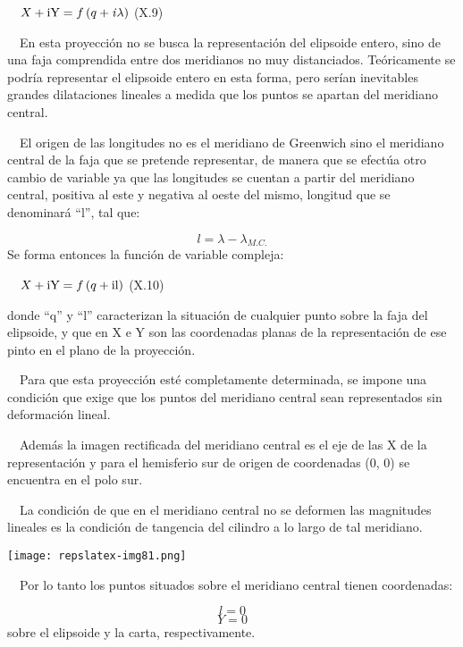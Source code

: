 \documentclass{tufte-book}
\newcommand\normalsubformula[1]{\text{\mathversion{normal}$#1$}}
\begin{document}
\ \  ${X+\normalsubformula{\text{iY}}=f\left(q+\mathit{i\lambda
}\right)}$  (X.9)

\ \ En esta proyección no se busca la representación del elipsoide
entero, sino de una faja comprendida entre dos meridianos no muy
distanciados. Teóricamente se podría representar el elipsoide
entero en esta forma, pero serían inevitables grandes dilataciones
lineales a medida que los puntos se apartan del meridiano central.

\ \ El origen de las longitudes no es el meridiano de Greenwich sino el
meridiano central de la faja que se pretende representar, de manera que
se efectúa otro cambio de variable ya que las longitudes se cuentan a
partir del meridiano central, positiva al este y negativa al oeste del
mismo, longitud que se denominará
{\textquotedblleft}l{\textquotedblright}, tal que:

\begin{equation*}
{l=\lambda -\lambda _{{M\text{.}C\text{.}}}}
\end{equation*}
Se forma entonces la función de variable compleja:

\ \ 
${X+\normalsubformula{\text{iY}}=f\left(q+\normalsubformula{\text{il}}\right)}$
 (X.10)

donde {\textquotedblleft}q{\textquotedblright} y
{\textquotedblleft}l{\textquotedblright} caracterizan la situación de
cualquier punto sobre la faja del elipsoide, y que en X e Y son las
coordenadas planas de la representación de ese pinto en el plano de
la proyección.

\ \ Para que esta proyección esté completamente determinada, se
impone una condición que exige que los puntos del meridiano central
sean representados sin deformación lineal.

\ \ Además la imagen rectificada del meridiano central es el eje de
las X de la representación y para el hemisferio sur de origen de
coordenadas (0, 0) se encuentra en el polo sur.

\ \ La condición de que en el meridiano central no se deformen las
magnitudes lineales es la condición de tangencia del cilindro a lo
largo de tal meridiano.

\begin{marginfigure}
\texttt{[image: repslatex-img81.png]}
\end{marginfigure}
 

\ \ Por lo tanto los puntos situados sobre el meridiano central tienen
coordenadas:

\begin{equation*}
{l=0}
\end{equation*}
\begin{equation*}
{Y=0}
\end{equation*}
sobre el elipsoide y la carta, respectivamente.
\end{document}
